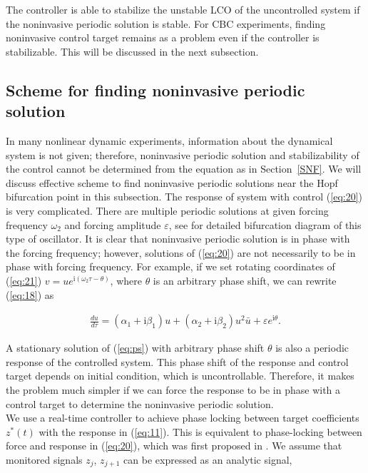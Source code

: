 \documentclass[openacc]{rsproca_new}%
\def\epsilon{\varepsilon}
\newcommand{\Eref}[1]{(\ref{#1})}
\newcommand{\Sref}[1]{Section~\ref{#1}}
\begin{document}
\noindent The controller is able to stabilize the unstable LCO of the uncontrolled system if the noninvasive periodic solution is stable. For CBC experiments, finding noninvasive control target remains as a problem even if the controller is stabilizable. This will be discussed in the next subsection.

\subsection{Scheme for finding noninvasive periodic solution}\label{FNP}

In many nonlinear dynamic experiments, information about the dynamical system is not given; therefore, noninvasive periodic solution and stabilizability of the control cannot be determined from the equation as in \Sref{SNF}. We will discuss effective scheme to find noninvasive periodic solutions near the Hopf bifurcation point in this subsection. The response of system with control \Eref{eq:20} is very complicated. There are multiple periodic solutions at given forcing frequency $\omega_2$ and forcing amplitude $\epsilon$, see \cite{zhang2011periodically,wiser2015bifurcations} for detailed bifurcation diagram of this type of oscillator. It is clear that noninvasive periodic solution is in phase with the forcing frequency; however, solutions of \Eref{eq:20} are not necessarily to be in phase with forcing frequency. For example, if we set rotating coordinates of \Eref{eq:21} $v=ue^{\textrm{i}(\omega_2 \tau-\theta)}$, where $\theta$ is an arbitrary phase shift, we can rewrite \Eref{eq:18}
as

\begin{align}\label{eq:ps}
\frac{du}{d\tau}=(\alpha_1+\textrm{i}\beta_1)u+(\alpha_2+\textrm{i}\beta_2)u^2 \bar u+\epsilon e^{\textrm{i}\theta}.
\end{align}

\noindent A stationary solution of \Eref{eq:ps} with arbitrary phase shift $\theta$ is also a periodic response of the controlled system. This phase shift of the response and control target depends on initial condition, which is uncontrollable. Therefore, it makes the problem much simpler if we can force the response to be in phase with a control target to determine the noninvasive periodic solution.\\
We use a real-time controller to achieve phase locking between target coefficients $z^*(t)$ with the response in \Eref{eq:11}. This is equivalent to phase-locking between force and response in \Eref{eq:20}, which was first proposed in \cite{irene}. We assume that monitored signals $z_j$, $z_{j+1}$ can be expressed as an analytic signal,
\end{document}
